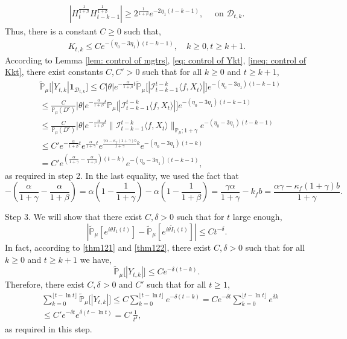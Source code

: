 \documentclass[12pt]{amsart}
\theoremstyle{plain}
\theoremstyle{definition}
\numberwithin{equation}{section}
\begin{document}
\begin{align*}
    |H_t^{\frac{1}{1+\beta}}H_{t-k-1}^{\frac{1}{1+\beta}}|
    \geq 2^{\frac{1}{1+\beta}} e^{-2\eta_1(t-k-1)},
    \quad \text{ on } \mathcal D_{t,k}.
\end{align*}
    Thus, there is a constant $C\geq 0$ such that,
\begin{align}
\label{ineq: control of Kkt}
     K_{t,k}
     \leq C e^{-(\eta_0 - 3\eta_1)(t-k-1)},
     \quad k \geq 0, t\geq k+1.
\end{align}
    According to Lemma \ref{lem: control of mgtrs}, \eqref{eq: control of Ykt}, \eqref{ineq: control of Kkt}, there exist constants $C,C'>0$ such that  for all $k\geq 0$ and $t\geq k+1$,
\begin{align}
\label{eq: Y in D}
    &\mathbb{\tilde{P}}_{\mu}\big[|Y_{t,k}|\mathbf{1}_{\mathcal{D}_{t,k}}\big]
    \leq C|\theta|e^{-\frac{\alpha}{1+\beta}t}\mathbb{\tilde{P}}_{\mu}\big[|\mathcal{I}_{t-k-1}^{t-k}\langle f,X_t\rangle|\big]e^{-(\eta_0 - 3\eta_1)(t-k-1)}
    \\&\leq \frac{C}{\mathbb{P}_{\mu}(D^c)}|\theta|e^{-\frac{\alpha}{1+\beta}t}\mathbb{P}_{\mu}\big[|\mathcal{I}_{t-k-1}^{t-k}\langle f,X_t\rangle|\big]e^{-(\eta_0 - 3\eta_1)(t-k-1)}
    \\&\leq \frac{C}{\mathbb{P}_{\mu}(D^c)}|\theta|e^{-\frac{\alpha}{1+\beta}t}\|\mathcal{I}_{t-k-1}^{t-k}\langle f,X_t\rangle\|_{\mathbb P_\mu; 1+\gamma} e^{-(\eta_0 - 3\eta_1)(t-k - 1)}
    \\&\leq C' e^{-\frac{\alpha}{1+\beta}t}e^{\frac{\alpha}{1+\gamma}t}e^{\frac{\gamma \alpha-\kappa_f(1+\gamma)b}{1+\gamma}k}e^{-(\eta_0 - 3\eta_1)(t-k)}\\&= C' e^{(\frac{\alpha}{1+\gamma}-\frac{\alpha}{1+\beta})(t-k)}e^{-(\eta_0 - 3\eta_1)(t-k-1)},
\end{align}
    as required in step 2. 
    In the last equality, we used the fact that
\[
    -(\frac{\alpha}{1+\gamma}-\frac{\alpha}{1+\beta})
    = \alpha(1-\frac{1}{1+\gamma}) - \alpha(1-\frac{1}{1+\beta})
    = \frac{\gamma \alpha}{1+\gamma} - k_f b
    =\frac{\alpha \gamma-\kappa_f(1+\gamma)b}{1+\gamma}.
\]

    Step 3. We will show that there exist $C, \delta> 0$ such that for $t$ large enough,
\[
    |\mathbb{\tilde{P}}_{\mu}[e^{i\theta I_1(t)}] - \mathbb{\tilde{P}}_{\mu}[e^{i\theta\tilde{I}_1(t)}]|
    \leq C t^{-\delta}.
\]
    In fact, according to \eqref{thm121} and \eqref{thm122}, there exist $C,\delta > 0$ such that
    for all $k \geq 0$ and $t\geq k+1$ we have,
\[
    \tilde{\mathbb P}_\mu\big[|Y_{t,k}|\big] 
    \leq C e^{-\delta(t-k)}.
\]
    Therefore, there exist $C, \delta > 0$ and $C'$ such that for all $t \geq 1$,
\begin{align}
    &\sum_{k=0}^{\lfloor t-\ln t \rfloor} \tilde {\mathbb P}_\mu\big[|Y_{t,k}|\big]
    \leq C\sum_{k=0}^{\lfloor t-\ln t \rfloor} e^{-\delta(t-k)}
    = C e^{-\delta t}\sum_{k=0}^{\lfloor t-\ln t \rfloor} e^{\delta k} 
    \\&\leq C' e^{-\delta t}e^{\delta (t-\ln t)} 
    = C'\frac{1}{t^{\delta}},
\end{align}
    as required in this step.
\end{document}

